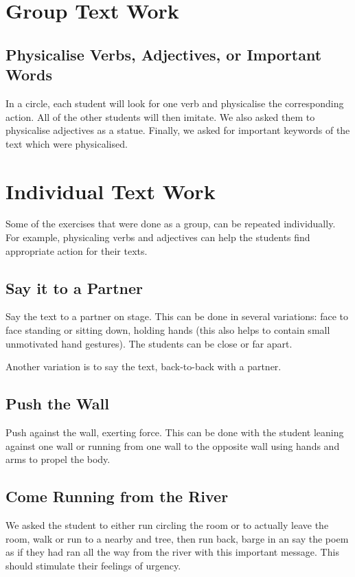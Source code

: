\documentclass[article,twocolumn,twoside]{memoir}
\begin{document}
\section{Group Text Work}


\subsection{Physicalise Verbs, Adjectives, or Important Words}

In a circle, each student will look for one verb and physicalise the
corresponding action. All of the other students will then imitate. We also
asked them to physicalise adjectives as a statue. Finally, we asked for
important keywords of the text which were physicalised.

\section{Individual Text Work}

Some of the exercises that were done as a group, can be repeated individually.
For example, physicaling verbs and adjectives can help the students find
appropriate action for their texts.

\subsection{Say it to a Partner}

Say the text to a partner on stage. This can be done in several variations:
face to face standing or sitting down, holding hands (this also helps to
contain small unmotivated hand gestures). The students can be close or far apart.

Another variation is to say the text, back-to-back with a partner.

\subsection{Push the Wall}

Push against the wall, exerting force. This can be done with the student
leaning against one wall or running from one wall to the opposite wall using
hands and arms to propel the body.

\subsection{Come Running from the River}

We asked the student to either run circling the room or to actually leave the
room, walk or run to a nearby and tree, then run back, barge in an say the poem
as if they had ran all the way from the river with this important message. This
should stimulate their feelings of urgency.
\end{document}
